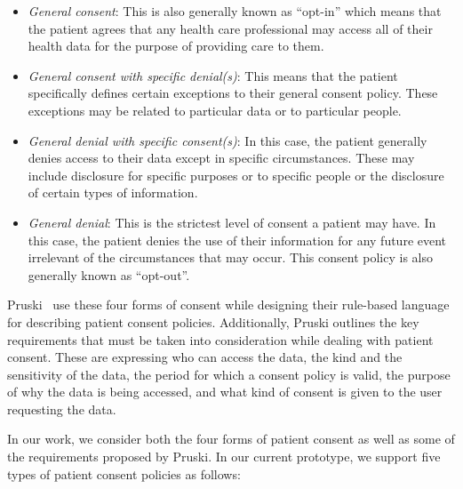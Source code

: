 \documentclass[conference]{IEEEtran}
\begin{document}
\begin{itemize}
 \item \textit{General consent}: This is also generally known as ``opt-in'' which means that the patient agrees that any health care professional may access
all of their health data for the purpose of providing care to them.
\item \textit{General consent with specific denial(s)}: This means that the patient specifically defines certain exceptions to their general consent policy.
These exceptions may be related to particular data or to particular people.
\item \textit{General denial with specific consent(s)}: In this case, the patient generally denies access to their data except in specific circumstances. These
may include disclosure for specific purposes or to specific people or the disclosure of certain types of information.
\item \textit{General denial}: This is the strictest level of consent a patient may have. In this case, the patient denies the use of their information for any
future event irrelevant of the circumstances that may occur. This consent policy is also generally known as ``opt-out''.
\end{itemize}

Pruski~\cite{pruski2010} use these four forms of consent while designing their rule-based language for describing patient consent policies. Additionally,
Pruski outlines the key requirements that must be taken into consideration while dealing with patient consent. These are expressing who can access the data,
the kind and the sensitivity of the data, the period for which a consent policy is valid, the purpose of why the data is being accessed, and what kind of
consent is given to the user requesting the data.

In our work, we consider both the four forms of patient consent as well as some of the requirements proposed by Pruski. In our current prototype, we support
five types of patient consent policies as follows:
\end{document}
